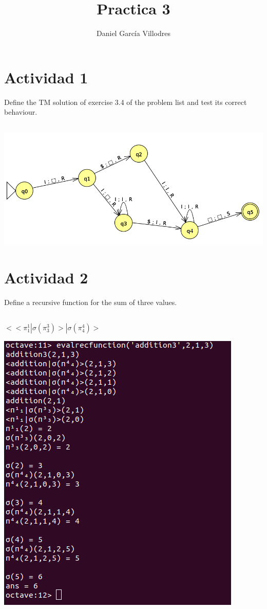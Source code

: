\documentclass[fleqn, 10pt]{article}
\title{\textbf{Practica 3}}
\author{Daniel García Villodres}
\date{}
\begin{document}
\maketitle
\thispagestyle{empty}

\section*{Actividad 1}
Define the TM solution of exercise 3.4 of the problem list and test its correct
behaviour.


\subsection*{}
\includegraphics[scale=0.5]{MT}


\section*{Actividad 2}
Define a recursive function for the sum of three values.

\subsection*{}

$<<\pi^1_1|\sigma\left(\pi^3_3\right)>|\sigma\left(\pi^4_4\right)>$

\includegraphics[scale=0.5]{FuncionR.png}
\end{document}
